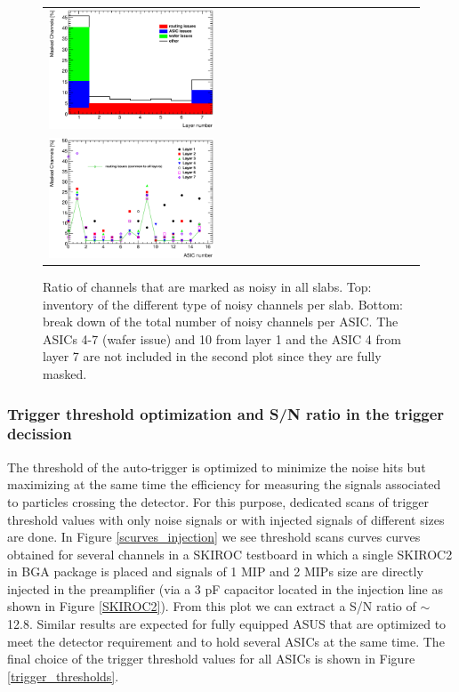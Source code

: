 \documentclass[final,3p,times,twocolumn]{elsarticle}
\begin{document}
\begin{figure}[!t]
  \centering
  \begin{tabular}{l}
  \includegraphics[width=0.45\textwidth]{../figs/commissioning/masked_layer.eps} \\
  \includegraphics[width=0.45\textwidth]{../figs/commissioning/masked_chip.eps}
  \end{tabular}
\caption{Ratio of channels that are marked as noisy in all slabs. 
Top: inventory of the different type of noisy channels per slab. 
Bottom: break down of the total number of noisy channels per ASIC. 
The ASICs 4-7 (wafer issue) and 10 from layer 1 and the ASIC 4 from layer 7 are not included
in the second plot since they are fully masked.}
\label{noisycells}
\end{figure}

\subsubsection{Trigger threshold optimization and S/N ratio in the trigger decission}
\label{sec:comm_trigger}

The threshold of the auto-trigger is optimized to minimize the noise hits
but maximizing at the same time the efficiency for measuring the signals associated
to particles crossing the detector. For this purpose, dedicated scans of trigger threshold values
with only noise signals or with injected signals of different sizes are done.
In Figure \ref{scurves_injection} we see threshold scans curves
 curves obtained for several channels
in a SKIROC testboard \cite{uehara:2018mqk} in which a single SKIROC2 in BGA package is placed and signals of 1 MIP and 2 MIPs size
are directly injected in the preamplifier 
(via a 3 pF capacitor located in the injection line as shown in Figure \ref{SKIROC2}). 
From this plot we can extract a S/N ratio of $\sim$12.8. Similar results are expected for
fully equipped ASUS that are optimized to meet the detector requirement and to hold several ASICs at the same time.
The final choice of the trigger threshold values for all ASICs is shown in Figure \ref{trigger_thresholds}.
\end{document}

